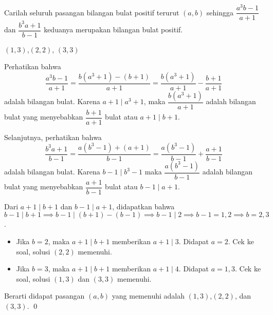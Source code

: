 \documentclass[11pt]{scrartcl}
\begin{document}
	\newpage
	\begin{soalbaru} 
		Carilah seluruh pasangan bilangan bulat positif terurut $(a,b)$ sehingga $\dfrac{a^3b-1}{a+1}$ dan $\dfrac{b^3a+1}{b-1}$ keduanya merupakan bilangan bulat positif.
		\begin{jawaban}
		$(1,3)$,$(2,2)$, $(3,3)$
		\end{jawaban}
		\begin{solusi}
			Perhatikan bahwa $$\dfrac{a^3b-1}{a+1}=\dfrac{b(a^3+1)-(b+1)}{a+1} =\dfrac{b(a^3+1)}{a+1}-\dfrac{b+1}{a+1}$$ adalah bilangan bulat. Karena $a+1 \mid a^3+1$, maka $\dfrac{b(a^3+1)}{a+1}$ adalah bilangan bulat yang menyebabkan $\dfrac{b+1}{a+1}$ bulat atau $a+1 \mid b+1$.
			
			Selanjutnya, perhatikan bahwa $$\dfrac{b^3a+1}{b-1}=\dfrac{a(b^3-1)+(a+1)}{b-1}=\dfrac{a(b^3-1)}{b-1}+\dfrac{a+1}{b-1}$$ adalah bilangan bulat. Karena $b-1 \mid b^3-1$ maka $\dfrac{a(b^3-1)}{b-1}$ adalah bilangan bulat yang menyebabkan $\dfrac{a+1}{b-1}$ bulat atau $b-1 \mid a+1$. 
			
			Dari $a+1 \mid b+1$ dan $b-1 \mid a+1$, didapatkan bahwa $b-1 \mid b+1 \implies b-1 \mid (b+1)-(b-1) \implies b-1 \mid 2 \implies b-1=1,2 \implies b=2,3$.
			
			\begin{itemize}
			\item Jika $b=2$, maka $a+1\mid b+1$ memberikan $a+1\mid 3$. Didapat $a=2$. Cek ke soal, solusi $(2,2)$ memenuhi.
						
			\item Jika $b=3$, maka $a+1 \mid b+1$ memberikan $a+1\mid 4$. Didapat $a=1,3$. Cek ke soal, solusi $(1,3)$ dan $(3,3)$ memenuhi.
			\end{itemize}
			
			Berarti didapat pasangan $(a,b)$ yang memenuhi adalah $(1,3)$,$(2,2)$, dan $(3,3)$. \qed 
		\end{solusi}
	\end{soalbaru}
	\newpage
	
\end{document}
